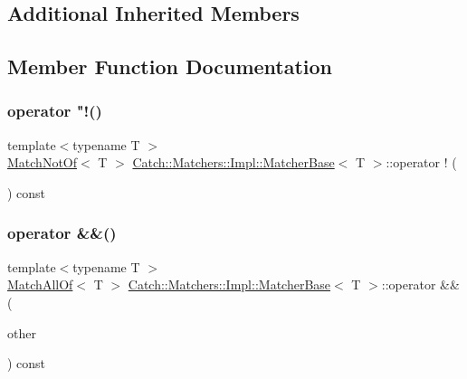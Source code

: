 \subsection*{Additional Inherited Members}


\subsection{Member Function Documentation}
\mbox{\label{struct_catch_1_1_matchers_1_1_impl_1_1_matcher_base_ab2ca564bb42ceaf8dbaf3426583bb28e}} 
\subsubsection{\texorpdfstring{operator "!()}{operator !()}}
{\footnotesize\ttfamily template$<$typename T $>$ \\
\mbox{\hyperlink{struct_catch_1_1_matchers_1_1_impl_1_1_match_not_of}{Match\+Not\+Of}}$<$ T $>$ \mbox{\hyperlink{struct_catch_1_1_matchers_1_1_impl_1_1_matcher_base}{Catch\+::\+Matchers\+::\+Impl\+::\+Matcher\+Base}}$<$ T $>$\+::operator ! (\begin{DoxyParamCaption}{ }\end{DoxyParamCaption}) const}

\mbox{\label{struct_catch_1_1_matchers_1_1_impl_1_1_matcher_base_aac4472c84f76c242ab4467f02e2ef8cc}} 
\subsubsection{\texorpdfstring{operator \&\&()}{operator \&\&()}}
{\footnotesize\ttfamily template$<$typename T $>$ \\
\mbox{\hyperlink{struct_catch_1_1_matchers_1_1_impl_1_1_match_all_of}{Match\+All\+Of}}$<$ T $>$ \mbox{\hyperlink{struct_catch_1_1_matchers_1_1_impl_1_1_matcher_base}{Catch\+::\+Matchers\+::\+Impl\+::\+Matcher\+Base}}$<$ T $>$\+::operator \&\& (\begin{DoxyParamCaption}\item[{\mbox{\hyperlink{struct_catch_1_1_matchers_1_1_impl_1_1_matcher_base}{Matcher\+Base}}$<$ T $>$ const \&}]{other }\end{DoxyParamCaption}) const}

